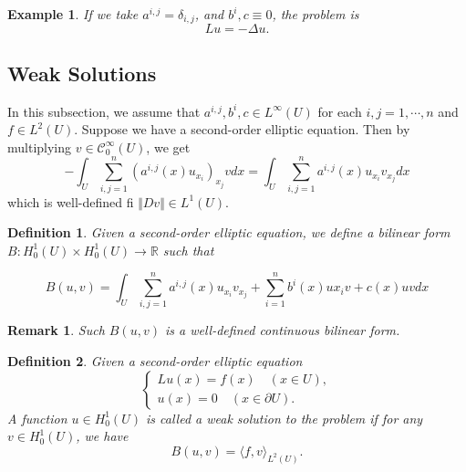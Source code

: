 \documentclass{article}
\newtheorem{definition}{Definition}[section]
\newtheorem{remark}{Remark}[section]
\newtheorem{example}{Example}[section]
\numberwithin{equation}{section}
\begin{document}
\begin{example}
If we take $a^{i,j}=\delta_{i,j}$, and $b^i,c\equiv 0$, the problem is 
\begin{equation*}
Lu = -\Delta u.
\end{equation*}
\end{example}

\subsection{Weak Solutions}

In this subsection, we assume that $a^{i,j},b^i,c\in L^\infty(U)$ for each $i,j=1,\cdots,n$ and $f\in L^2(U)$. Suppose we have a second-order elliptic equation. Then by multiplying $v\in\mathcal{C}^\infty_0(U)$, we get
\begin{equation*}
-\int_U\sum_{i,j=1}^n(a^{i,j}(x)u_{x_i})_{x_j}vdx = \int_U\sum_{i,j=1}^na^{i,j}(x)u_{x_i}v_{x_j}dx
\end{equation*}
which is well-defined fi $\Vert Dv\Vert\in L^1(U)$. 

\begin{definition}
Given a second-order elliptic equation, we define a bilinear form $B:H_0^1(U)\times H_0^1(U)\to\mathbb{R}$ such that

\begin{equation*}
B(u,v) = \int_U\sum_{i,j=1}^na^{i,j}(x)u_{x_i}v_{x_j}+\sum_{i=1}^nb^i(x)u{x_i}v+c(x)uvdx
\end{equation*}
\end{definition}

\begin{remark}
Such $B(u,v)$ is a well-defined continuous bilinear form.
\end{remark}

\begin{definition}
Given a second-order elliptic equation
\begin{equation*}
\begin{cases}
Lu(x) = f(x) \quad (x\in U),\\
u(x) = 0 \quad (x\in \partial U).
\end{cases}
\end{equation*}
A function $u\in H_0^1(U)$ is called a weak solution to the problem if for any $v\in H_0^1(U)$, we have
\begin{equation*}
B(u,v) = \langle f,v\rangle_{L^2(U)}.
\end{equation*}
\end{definition}
\end{document}
